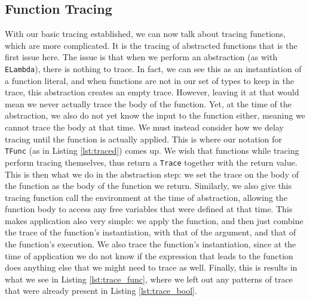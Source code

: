     \subsection{Function Tracing} \label{sec:functions}
        With our basic tracing established, we can now talk about tracing functions, which are more complicated.
        It is the tracing of abstracted functions that is the first issue here.
        The issue is that when we perform an abstraction (as with \texttt{ELambda}), there is nothing to trace.
        In fact, we can see this as an instantiation of a function literal, and when functions are not in our set of types to keep in the trace, this abstraction creates an empty trace.
        However, leaving it at that would mean we never actually trace the body of the function.
        Yet, at the time of the abstraction, we also do not yet know the input to the function either, meaning we cannot trace the body at that time.
        We must instead consider how we delay tracing until the function is actually applied.
        This is where our notation for \texttt{TFunc} (as in Listing \ref{lst:traced}) comes up.
        We wish that functions while tracing perform tracing themselves, thus return a \texttt{Trace} together with the return value.
        This is then what we do in the abstraction step: we set the trace on the body of the function as the body of the function we return.
        Similarly, we also give this tracing function call the environment at the time of abstraction, allowing the function body to access any free variables that were defined at that time.
        This makes application also very simple: we apply the function, and then just combine the trace of the function's instantiation, with that of the argument, and that of the function's execution.
        We also trace the function's instantiation, since at the time of application we do not know if the expression that leads to the function does anything else that we might need to trace as well.
        Finally, this is results in what we see in Listing \ref{lst:trace_func}, where we left out any patterns of trace that were already present in Listing \ref{lst:trace_bool}.

